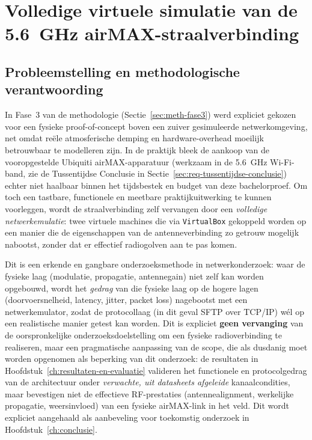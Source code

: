
\section{Volledige virtuele simulatie van de 5.6~GHz airMAX-straalverbinding}%
\label{sec:virtuele-simulatie-airmax}

\subsection{Probleemstelling en methodologische verantwoording}%
\label{subsec:sim-verantwoording}

In Fase~3 van de methodologie (Sectie~\ref{sec:meth-fase3}) werd expliciet gekozen voor
een fysieke proof-of-concept boven een zuiver gesimuleerde netwerkomgeving, net omdat
reële atmosferische demping en hardware-overhead moeilijk betrouwbaar te modelleren
zijn. In de praktijk bleek de aankoop van de vooropgestelde Ubiquiti airMAX-apparatuur
(werkzaam in de 5.6~GHz Wi-Fi-band, zie de Tussentijdse Conclusie in
Sectie~\ref{sec:req-tussentijdse-conclusie}) echter niet haalbaar binnen het tijdsbestek
en budget van deze bachelorproef. Om toch een tastbare, functionele en meetbare
praktijkuitwerking te kunnen voorleggen, wordt de straalverbinding zelf vervangen door
een \emph{volledige netwerkemulatie}: twee virtuele machines die via
\texttt{VirtualBox} gekoppeld worden op een manier die de eigenschappen van de
antenneverbinding zo getrouw mogelijk nabootst, zonder dat er effectief radiogolven aan
te pas komen.

Dit is een erkende en gangbare onderzoeksmethode in netwerkonderzoek: waar de fysieke
laag (modulatie, propagatie, antennegain) niet zelf kan worden opgebouwd, wordt het
\emph{gedrag} van die fysieke laag op de hogere lagen (doorvoersnelheid, latency,
jitter, packet loss) nagebootst met een netwerkemulator, zodat de protocollaag (in dit
geval SFTP over TCP/IP) wél op een realistische manier getest kan worden. Dit is
expliciet \textbf{geen vervanging} van de oorspronkelijke onderzoeksdoelstelling om een
fysieke radioverbinding te realiseren, maar een pragmatische aanpassing van de scope,
die als dusdanig moet worden opgenomen als beperking van dit onderzoek: de resultaten
in Hoofdstuk~\ref{ch:resultaten-en-evaluatie} valideren het functionele en
protocolgedrag van de architectuur onder \emph{verwachte, uit datasheets afgeleide}
kanaalcondities, maar bevestigen niet de effectieve RF-prestaties (antennealignment,
werkelijke propagatie, weersinvloed) van een fysieke airMAX-link in het veld. Dit wordt
expliciet aangehaald als aanbeveling voor toekomstig onderzoek in
Hoofdstuk~\ref{ch:conclusie}.

